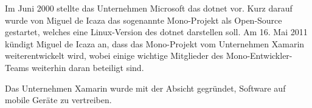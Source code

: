 Im Juni 2000 stellte das Unternehmen Microsoft das \ac{dotnet} vor.
Kurz darauf wurde von Miguel de Icaza das sogenannte Mono-Projekt als Open-Source gestartet, welches eine Linux-Version des \ac{dotnet} darstellen soll.
Am 16. Mai 2011 kündigt Miguel de Icaza an, dass das Mono-Projekt vom Unternehmen Xamarin weiterentwickelt wird, wobei einige wichtige Mitglieder des Mono-Entwickler-Teams weiterhin daran beteiligt sind.

Das Unternehmen Xamarin wurde mit der Absicht gegründet, Software auf mobile Geräte zu vertreiben. 